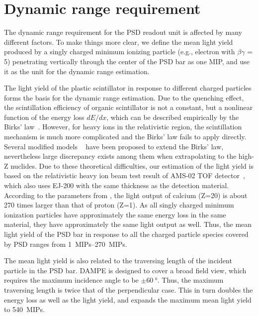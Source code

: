\documentclass[preprint, times]{elsarticle}
\begin{document}
\section{Dynamic range requirement}
\label{sec:requirement}

The dynamic range requirement for the PSD readout unit is affected by many different factors.
To make things more clear, we define the mean light yield produced by a singly charged minimum ionizing particle (e.g., electron with $\beta\gamma$ = 5) penetrating vertically through the center of the PSD bar as one MIP, and use it as the unit for the dynamic range estimation.

The light yield of the plastic scintillator in response to different charged particles forms the basis for the dynamic range estimation.
Due to the quenching effect, the scintillation efficiency of organic scintillator is not a constant, but a nonlinear function of the energy loss $dE/dx$, which can be described empirically by the Birks' law~\cite{birks_theory_2013}.
 However, for heavy ions in the relativistic region, the scintillation mechanism is much more complicated and the Birks' law fails to apply directly. 
 Several modified models ~\cite{chou_nature_1952,tarle_cosmic_1979,menchaca-rocha_response_1999,matsufuji_response_1999} have been proposed to extend the Birks' law, nevertheless large discrepancy exists among them when extrapolating to the high-Z nuclides.
Due to these theoretical difficulties, our estimation of the light yield is based on the relativistic heavy ion beam test result of AMS-02 TOF detector~\cite{bindi2005performance,bindi_calibration_2014}, which also uses EJ-200 with the same thickness as the detection material.
According to the parameters from \cite{bindi2005performance}, the light output of calcium (Z=20) is about 270 times larger than that of proton (Z=1).
As all singly charged minimum ionization particles have approximately the same energy loss in the same material, they have approximately the same light output as well.
Thus, the mean light yield of the PSD bar in response to all the charged particle species covered by PSD ranges from \SIrange{1}{270}{MIPs}.

The mean light yield is also related to the traversing length of the incident particle in the PSD bar.
DAMPE is designed to cover a broad field view, which requires the maximum incidence angle to be $\pm\SI{60}{\degree}$.
Thus, the maximum traversing length is twice that of the perpendicular case.
This in turn doubles the energy loss as well as the light yield, and expands the maximum mean light yield to \SI{540}{MIPs}.
\end{document}
